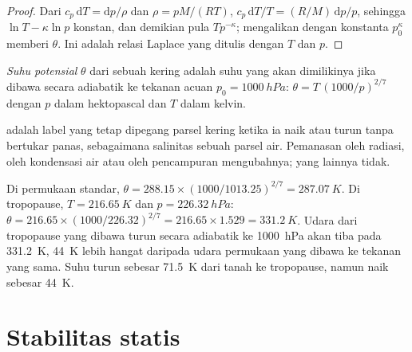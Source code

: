 \begin{proof}
Dari $c_p\,\mathrm dT = \mathrm dp/\rho$ dan $\rho = pM/(RT)$, $c_p\,\mathrm dT/T
= (R/M)\,\mathrm dp/p$, sehingga $\ln T - \kappa \ln p$ konstan, dan demikian pula $T
p^{-\kappa}$; mengalikan dengan konstanta $p_0^{\kappa}$ memberi $\theta$. Ini adalah relasi Laplace yang ditulis dengan $T$ dan $p$.
\end{proof}

\begin{definition}\label{def:b1:fluid-envelopes-structure:potential-temperature}
\emph{Suhu potensial} $\theta$ dari sebuah  kering adalah suhu yang akan dimilikinya jika dibawa secara adiabatik ke tekanan acuan $p_0 = \qty{1000}{hPa}$: $\theta = T\,(1000/p)^{2/7}$ dengan $p$ dalam hektopascal dan $T$ dalam kelvin.
\end{definition}

 adalah label yang tetap dipegang parsel kering ketika ia naik atau turun tanpa bertukar panas, sebagaimana salinitas sebuah parsel air. Pemanasan oleh radiasi, oleh kondensasi air atau oleh pencampuran mengubahnya; yang lainnya tidak.

\begin{example}\label{ex:b1:fluid-envelopes-structure:tropopause}
Di permukaan standar,  $\theta = 288.15 \times (1000/1013.25)^{2/7} =
\qty{287.07}{K}$. Di tropopause, $T = \qty{216.65}{K}$ dan $p =
\qty{226.32}{hPa}$: $\theta = 216.65 \times (1000/226.32)^{2/7} = 216.65 \times
1.529 = \qty{331.2}{K}$. Udara dari tropopause yang dibawa turun secara adiabatik ke
\qty{1000}{hPa} akan tiba pada \qty{331.2}{K}, \qty{44}{K} lebih hangat daripada udara
permukaan yang dibawa ke tekanan yang sama. Suhu turun sebesar \qty{71.5}{K} dari tanah
ke tropopause, namun  naik sebesar \qty{44}{K}.
\end{example}

\section{Stabilitas statis}\label{sec:b1:fluid-envelopes-structure:stability}

